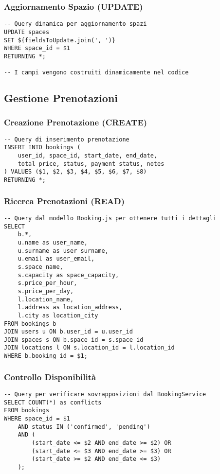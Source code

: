 \subsubsection{Aggiornamento Spazio (UPDATE)}
\begin{lstlisting}[caption=Aggiornamento Dinamico Spazio]
-- Query dinamica per aggiornamento spazi
UPDATE spaces 
SET ${fieldsToUpdate.join(', ')} 
WHERE space_id = $1
RETURNING *;

-- I campi vengono costruiti dinamicamente nel codice
\end{lstlisting}

\newpage

\subsection{Gestione Prenotazioni}

\subsubsection{Creazione Prenotazione (CREATE)}
\begin{lstlisting}[caption=Inserimento Prenotazione dal Modello Booking.js]
-- Query di inserimento prenotazione
INSERT INTO bookings (
    user_id, space_id, start_date, end_date,
    total_price, status, payment_status, notes
) VALUES ($1, $2, $3, $4, $5, $6, $7, $8)
RETURNING *;
\end{lstlisting}

\subsubsection{Ricerca Prenotazioni (READ)}
\begin{lstlisting}[caption=Query Prenotazione con Dettagli Completi]
-- Query dal modello Booking.js per ottenere tutti i dettagli
SELECT 
    b.*,
    u.name as user_name,
    u.surname as user_surname,
    u.email as user_email,
    s.space_name,
    s.capacity as space_capacity,
    s.price_per_hour,
    s.price_per_day,
    l.location_name,
    l.address as location_address,
    l.city as location_city
FROM bookings b
JOIN users u ON b.user_id = u.user_id
JOIN spaces s ON b.space_id = s.space_id
JOIN locations l ON s.location_id = l.location_id
WHERE b.booking_id = $1;
\end{lstlisting}

\subsubsection{Controllo Disponibilità}
\begin{lstlisting}[caption=Verifica Conflitti Prenotazioni]
-- Query per verificare sovrapposizioni dal BookingService
SELECT COUNT(*) as conflicts
FROM bookings
WHERE space_id = $1
    AND status IN ('confirmed', 'pending')
    AND (
        (start_date <= $2 AND end_date >= $2) OR
        (start_date <= $3 AND end_date >= $3) OR
        (start_date >= $2 AND end_date <= $3)
    );
\end{lstlisting}

